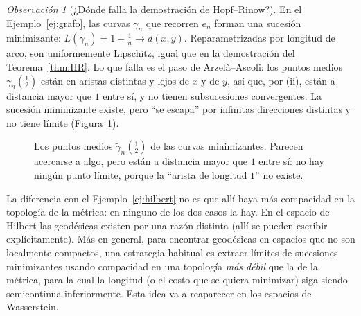 \documentclass[12pt, a4paper]{amsart}
\theoremstyle{definition}
\theoremstyle{remark}
\newtheorem{observacion}[teorema]{Observación}
\begin{document}
\begin{observacion}[¿Dónde falla la demostración de Hopf--Rinow?]
En el Ejemplo~\ref{ej:grafo}, las curvas $\gamma_n$ que recorren $e_n$ forman una sucesión minimizante: $L(\gamma_n)=1+\frac1n\to d(x,y)$. Reparametrizadas por longitud de arco, son uniformemente Lipschitz, igual que en la demostración del Teorema~\ref{thm:HR}. Lo que falla es el paso de Arzelà--Ascoli: los puntos medios $\tilde\gamma_n(\frac12)$ están en aristas distintas y lejos de $x$ y de $y$, así que, por (ii), están a distancia mayor que $1$ entre sí, y no tienen subsucesiones convergentes. La sucesión minimizante existe, pero ``se escapa'' por infinitas direcciones distintas y no tiene límite (Figura~\ref{fig:escape}).

\begin{figure}[htbp]
\centering
{}
\caption{Los puntos medios $\tilde\gamma_n(\frac12)$ de las curvas minimizantes. Parecen acercarse a algo, pero están a distancia mayor que $1$ entre sí: no hay ningún punto límite, porque la ``arista de longitud $1$'' no existe.}
\label{fig:escape}
\end{figure}

La diferencia con el Ejemplo~\ref{ej:hilbert} no es que allí haya más compacidad en la topología de la métrica: en ninguno de los dos casos la hay. En el espacio de Hilbert las geodésicas existen por una razón distinta (allí se pueden escribir explícitamente). Más en general, para encontrar geodésicas en espacios que no son localmente compactos, una estrategia habitual es extraer límites de sucesiones minimizantes usando compacidad en una topología \emph{más débil} que la de la métrica, para la cual la longitud (o el costo que se quiera minimizar) siga siendo semicontinua inferiormente. Esta idea va a reaparecer en los espacios de Wasserstein.
\end{observacion}
\end{document}
